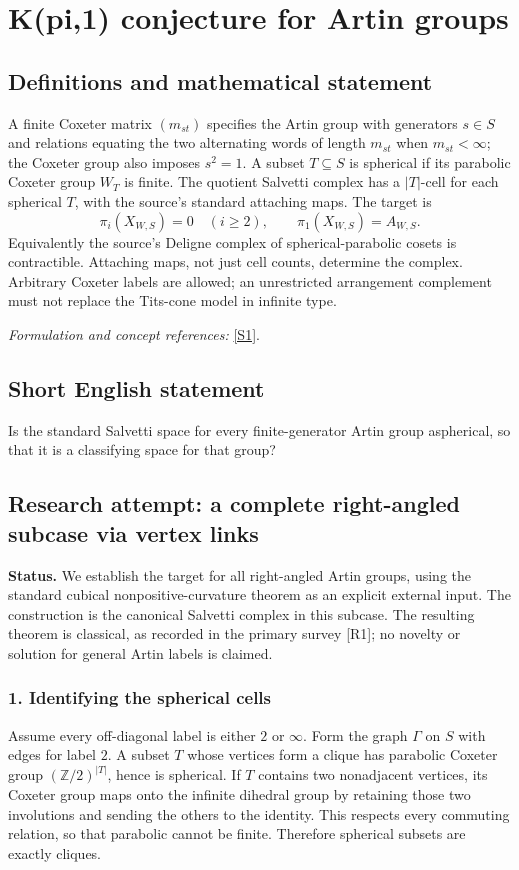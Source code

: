 \documentclass[11pt]{article}
\begin{document}
\section*{\texorpdfstring{K(pi,1) conjecture for Artin groups}{K(pi,1) conjecture for Artin groups}}\label{statement}
\subsection{Definitions and mathematical statement}
A finite Coxeter matrix $(m_{st})$ specifies the Artin group with generators $s\in S$ and relations equating the two alternating words of length $m_{st}$ when $m_{st}<\infty$; the Coxeter group also imposes $s^2=1$. A subset $T\subseteq S$ is spherical if its parabolic Coxeter group $W_T$ is finite. The quotient Salvetti complex has a $|T|$-cell for each spherical $T$, with the source's standard attaching maps. The target is
\[
 \pi_i(X_{W,S})=0\quad(i\ge2),\qquad\pi_1(X_{W,S})=A_{W,S}.
\]
Equivalently the source's Deligne complex of spherical-parabolic cosets is contractible. Attaching maps, not just cell counts, determine the complex. Arbitrary Coxeter labels are allowed; an unrestricted arrangement complement must not replace the Tits-cone model in infinite type.
\par\smallskip\textit{Formulation and concept references:} \href{https://arxiv.org/html/2607.24659v1}{[S1]}.

\subsection{Short English statement}
Is the standard Salvetti space for every finite-generator Artin group aspherical, so that it is a classifying space for that group?
\subsection{Research attempt: a complete right-angled subcase via vertex links}
\textbf{Status.} We establish the target for all right-angled Artin groups, using the standard cubical nonpositive-curvature theorem as an explicit external input. The construction is the canonical Salvetti complex in this subcase. The resulting theorem is classical, as recorded in the primary survey [R1]; no novelty or solution for general Artin labels is claimed.

\subsubsection{1. Identifying the spherical cells}
Assume every off-diagonal label is either $2$ or $\infty$. Form the graph $\Gamma$ on $S$ with edges for label $2$. A subset $T$ whose vertices form a clique has parabolic Coxeter group $(\mathbb Z/2)^{|T|}$, hence is spherical. If $T$ contains two nonadjacent vertices, its Coxeter group maps onto the infinite dihedral group by retaining those two involutions and sending the others to the identity. This respects every commuting relation, so that parabolic cannot be finite. Therefore spherical subsets are exactly cliques.
\end{document}
